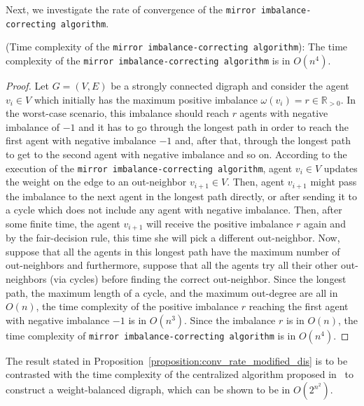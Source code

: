 \documentclass[final]{siamltex}
\begin{document}
Next, we investigate the rate of convergence of the {\texttt{mirror imbalance-correcting
    algorithm}\xspace}. 

\begin{proposition}{\mbox{}\textup{({Time complexity of the
    {\texttt{mirror imbalance-correcting
    algorithm}\xspace}}):}}\label{proposition:conv_rate_modified_dis}
  The time complexity of the {\texttt{mirror imbalance-correcting
    algorithm}\xspace} is in $ O(n^4) $.
\end{proposition}
\begin{proof} 
  Let $ G=(V,E) $ be a strongly connected digraph and consider the
  agent $ v_i\in V $ which initially has the maximum positive
  imbalance $ \omega(v_i)=r \in \mathbb{R}_{>0} $.  In the worst-case
  scenario, this imbalance should reach $ r $ agents with negative
  imbalance of $ -1 $ and it has to go through the longest path in
  order to reach the first agent with negative imbalance $ -1 $ and,
  after that, through the longest path to get to the second agent with
  negative imbalance and so on.  According to the execution of the
  {\texttt{mirror imbalance-correcting
    algorithm}\xspace}, agent $ v_i \in V $ updates the weight on the edge to an
  out-neighbor $ v_{i+1} \in V $. Then, agent $ v_{i+1} $ might pass
  the imbalance to the next agent in the longest path directly, or
  after sending it to a cycle which does not include any agent with
  negative imbalance.  Then, after some finite time, the agent $
  v_{i+1} $ will receive the positive imbalance $ r $ again and by the
  fair-decision rule, this time she will pick a different
  out-neighbor. Now, suppose that all the agents in this longest path
  have the maximum number of out-neighbors and furthermore, suppose
  that all the agents try all their other out-neighbors (via cycles)
  before finding the correct out-neighbor. Since the longest path, the
  maximum length of a cycle, and the maximum out-degree are all in $
  O(n) $, the time complexity of the positive imbalance $ r $ reaching
  the first agent with negative imbalance $-1$ is in $ O(n^3) $.
  Since the imbalance $ r $ is in $ O(n) $, the time complexity of
  {\texttt{mirror imbalance-correcting
    algorithm}\xspace} is in $ O(n^4) $.
\end{proof}

The result stated in
Proposition~\ref{proposition:conv_rate_modified_dis} is to be
contrasted with the time complexity of the centralized algorithm
proposed in~\cite{LHT:70} to construct a weight-balanced digraph,
which can be shown to be in $O(2^{n^2})$.
\end{document}
